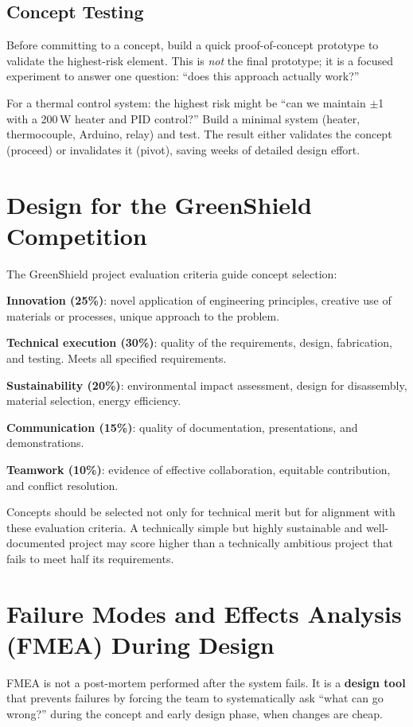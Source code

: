 \subsection{Concept Testing}
Before committing to a concept, build a quick proof-of-concept prototype to validate the highest-risk element. This is \emph{not} the final prototype; it is a focused experiment to answer one question: ``does this approach actually work?''

For a thermal control system: the highest risk might be ``can we maintain $\pm$1\,\degC{} with a 200\,W heater and PID control?'' Build a minimal system (heater, thermocouple, Arduino, relay) and test. The result either validates the concept (proceed) or invalidates it (pivot), saving weeks of detailed design effort.

\section{Design for the GreenShield Competition}
The GreenShield project evaluation criteria guide concept selection:

\textbf{Innovation (25\%)}: novel application of engineering principles, creative use of materials or processes, unique approach to the problem.

\textbf{Technical execution (30\%)}: quality of the requirements, design, fabrication, and testing. Meets all specified requirements.

\textbf{Sustainability (20\%)}: environmental impact assessment, design for disassembly, material selection, energy efficiency.

\textbf{Communication (15\%)}: quality of documentation, presentations, and demonstrations.

\textbf{Teamwork (10\%)}: evidence of effective collaboration, equitable contribution, and conflict resolution.

Concepts should be selected not only for technical merit but for alignment with these evaluation criteria. A technically simple but highly sustainable and well-documented project may score higher than a technically ambitious project that fails to meet half its requirements.
\section{Failure Modes and Effects Analysis (FMEA) During Design}
FMEA is not a post-mortem performed after the system fails. It is a \textbf{design tool} that prevents failures by forcing the team to systematically ask ``what can go wrong?'' during the concept and early design phase, when changes are cheap.

